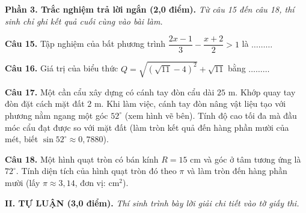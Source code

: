 \documentclass[11pt,a4paper]{article}
\begin{document}
\vspace{3mm}
\noindent
\textbf{Phần 3. Trắc nghiệm trả lời ngắn (2,0 điểm).} \textit{Từ câu 15 đến câu 18, thí sinh chỉ ghi kết quả cuối cùng vào bài làm.}

\vspace{1.5mm}
\textbf{Câu 15.} Tập nghiệm của bất phương trình $\dfrac{2x - 1}{3} - \dfrac{x + 2}{2} > 1$ là $\dots\dots\dots$

\vspace{1.5mm}
\textbf{Câu 16.} Giá trị của biểu thức $Q = \sqrt{(\sqrt{11} - 4)^2} + \sqrt{11}$ bằng $\dots\dots\dots$

\vspace{1.5mm}
\noindent
\begin{minipage}[c]{0.65\linewidth}
\textbf{Câu 17.} Một cần cẩu xây dựng có cánh tay đòn cẩu dài $25\text{ m}$. Khớp quay tay đòn đặt cách mặt đất $2\text{ m}$. Khi làm việc, cánh tay đòn nâng vật liệu tạo với phương nằm ngang một góc $52^\circ$ (xem hình vẽ bên). Tính độ cao tối đa mà đầu móc cẩu đạt được so với mặt đất (làm tròn kết quả đến hàng phần mười của mét, biết $\sin 52^\circ \approx 0{,}7880$).
\end{minipage}\hfill
\begin{minipage}[c]{0.32\linewidth}
\centering
{}
\end{minipage}

\vspace{1.5mm}
\textbf{Câu 18.} Một hình quạt tròn có bán kính $R = 15\text{ cm}$ và góc ở tâm tương ứng là $72^\circ$. Tính diện tích của hình quạt tròn đó theo $\pi$ và làm tròn đến hàng phần mười (lấy $\pi \approx 3{,}14$, đơn vị: $\text{cm}^2$).

\vspace{4mm}
\noindent
\textbf{\large II. TỰ LUẬN (3,0 điểm).} \textit{Thí sinh trình bày lời giải chi tiết vào tờ giấy thi.}
\end{document}
